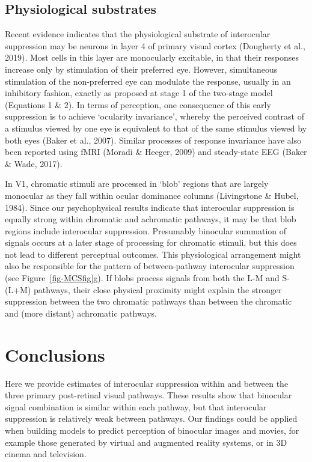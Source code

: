 \documentclass[
  letterpaper,
  DIV=11,
  numbers=noendperiod]{scrartcl}
\begin{document}
\hypertarget{physiological-substrates}{%
\subsection{Physiological substrates}\label{physiological-substrates}}

Recent evidence indicates that the physiological substrate of
interocular suppression may be neurons in layer 4 of primary visual
cortex (Dougherty et al., 2019). Most cells in this layer are
monocularly excitable, in that their responses increase only by
stimulation of their preferred eye. However, simultaneous stimulation of
the non-preferred eye can modulate the response, usually in an
inhibitory fashion, exactly as proposed at stage 1 of the two-stage
model (Equations 1 \& 2). In terms of perception, one consequence of
this early suppression is to achieve `ocularity invariance', whereby the
perceived contrast of a stimulus viewed by one eye is equivalent to that
of the same stimulus viewed by both eyes (Baker et al., 2007). Similar
processes of response invariance have also been reported using fMRI
(Moradi \& Heeger, 2009) and steady-state EEG (Baker \& Wade, 2017).

In V1, chromatic stimuli are processed in `blob' regions that are
largely monocular as they fall within ocular dominance columns
(Livingstone \& Hubel, 1984). Since our psychophysical results indicate
that interocular suppression is equally strong within chromatic and
achromatic pathways, it may be that blob regions include interocular
suppression. Presumably binocular summation of signals occurs at a later
stage of processing for chromatic stimuli, but this does not lead to
different perceptual outcomes. This physiological arrangement might also
be responsible for the pattern of between-pathway interocular
suppression (see Figure~\ref{fig-MCSfig}g). If blobs process signals
from both the L-M and S-(L+M) pathways, their close physical proximity
might explain the stronger suppression between the two chromatic
pathways than between the chromatic and (more distant) achromatic
pathways.

\hypertarget{conclusions}{%
\section{Conclusions}\label{conclusions}}

Here we provide estimates of interocular suppression within and between
the three primary post-retinal visual pathways. These results show that
binocular signal combination is similar within each pathway, but that
interocular suppression is relatively weak between pathways. Our
findings could be applied when building models to predict perception of
binocular images and movies, for example those generated by virtual and
augmented reality systems, or in 3D cinema and television.
\end{document}
